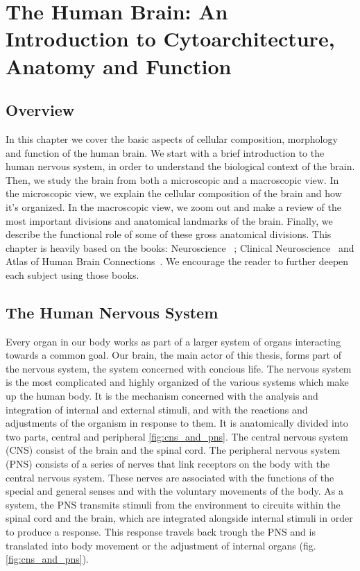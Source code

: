 
\chapter{The Human Brain: An Introduction to Cytoarchitecture, Anatomy and Function}
\label{ch:intro_anato}

\section{Overview}
In this chapter we cover the basic aspects of cellular composition, morphology
and function of the human brain. We start with a brief introduction to the
human nervous system, in order to understand the biological context of the brain.
Then, we study the brain from both a microscopic and a macroscopic view. In the
microscopic view, we explain the cellular composition of the brain and how it’s
organized. In the macroscopic view, we zoom out and make a review of the most 
important divisions and anatomical landmarks of the brain. Finally, we describe
the functional role of some of these gross anatomical divisions. This chapter is
heavily based on the books: Neuroscience~\cite{Purves2004} ; Clinical
Neuroscience~\cite{Johns} and Atlas of Human Brain Connections~\cite{Catani2012}.
We encourage the reader to further deepen each subject using those books.

\section{The Human Nervous System}
Every organ in our body works as part of a larger system of organs interacting
towards a common goal. Our brain, the main actor of this thesis,
forms part of the nervous system, the system concerned with concious life.
The nervous system is the most complicated and highly organized of the various
systems which make up the human body\cite{Gray1918}. It is the mechanism
concerned with the analysis and integration of internal and external stimuli,
and with the reactions and adjustments of the organism in response to them. It
is anatomically divided into two parts, central and peripheral \ref{fig:cns_and_pns}.
The central nervous system (CNS) consist of the brain and the spinal cord. The
peripheral nervous system (PNS) consists of a series of nerves that link
receptors on the body with the central nervous system. These nerves are
associated with the functions of the special and general senses and with the
voluntary movements of the body. As a system, the PNS transmits stimuli from
the environment to circuits within the spinal cord and the brain, which are
integrated alongside internal stimuli in order to produce a response. This
response travels back trough the PNS and is translated into body movement or
the adjustment of internal organs (fig. \ref{fig:cns_and_pns}). 


